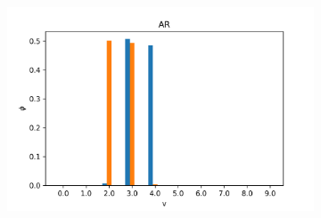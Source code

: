 \documentclass[12pt]{article}
\begin{document}
\begin{figure}[H]
\begin{subfigure}[b]{0.3\textwidth}
    \includegraphics[width=\linewidth]{latent_phis_AR_experiment-1|overlapping-yes_dataset-9.png}
  \end{subfigure}%


\end{figure}
\end{document}
